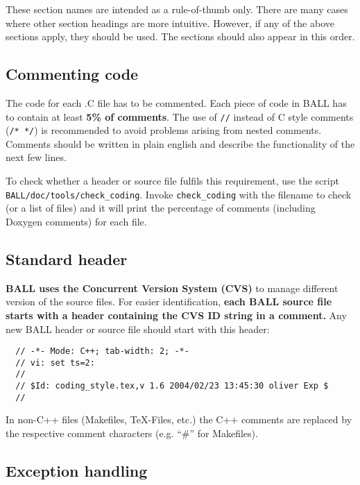 \documentclass[a4paper,10pt]{article}
\begin{document}
These section names are intended as a rule-of-thumb only. There are many cases
where other section headings are more intuitive. However, if any of the above
sections apply, they should be used. The sections should also appear in this
order.

\subsection{Commenting code}

The code for each .C file has to be commented. Each piece of code in BALL has
to contain at least {\bf 5\% of comments}. The use of {\tt //} instead of C style
comments ({\tt /* */}) is recommended to avoid problems arising from nested
comments. Comments should be written in plain english and describe the
functionality of the next few lines.

To check whether a header or source file fulfils this requirement, use the
script {\tt BALL/doc/tools/check\_coding}. Invoke {\tt check\_coding} with the
filename to check (or a list of files) and it will print the percentage of
comments (including Doxygen comments) for each file.

\subsection{Standard header}
                                                                                                                                                             
{\bf BALL uses the Concurrent Version System (CVS)} to manage different
version of the
source files. For easier identification, {\bf each BALL source file starts
with a header containing the CVS ID string in a comment.} Any new BALL header
or source file should start with this header:
\begin{verbatim}
  // -*- Mode: C++; tab-width: 2; -*-
  // vi: set ts=2:
  //
  // $Id: coding_style.tex,v 1.6 2004/02/23 13:45:30 oliver Exp $
  //                                                                                                                                                             
\end{verbatim}
In non-C++ files (Makefiles, TeX-Files, etc.) the C++ comments are replaced
by the respective comment characters (e.g. ``\#'' for Makefiles).

\subsection{Exception handling}
\end{document}
